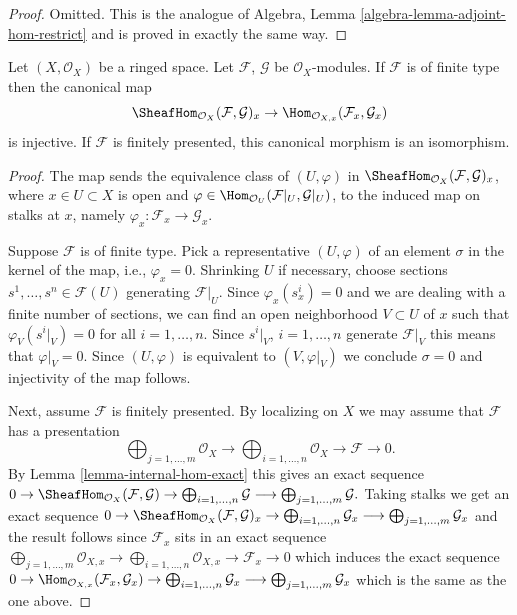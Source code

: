 \begin{proof}
Omitted. This is the analogue of
Algebra, Lemma \ref{algebra-lemma-adjoint-hom-restrict}
and is proved in exactly the same way.
\end{proof}

\begin{lemma}
\label{lemma-stalk-internal-hom}
Let $(X, \mathcal{O}_X)$ be a ringed space.
Let $\mathcal{F}$, $\mathcal{G}$ be $\mathcal{O}_X$-modules.
If $\mathcal{F}$ is of finite type then the canonical map
$$
\SheafHom_{\mathcal{O}_X}(\mathcal{F}, \mathcal{G})_x
\to
\Hom_{\mathcal{O}_{X, x}}(\mathcal{F}_x, \mathcal{G}_x)
$$
is injective.
If $\mathcal{F}$ is finitely presented,
this canonical morphism is an isomorphism.
\end{lemma}

\begin{proof}
The map sends the equivalence class of
$(U, \varphi)$ in $\SheafHom_{\mathcal{O}_X}(\mathcal{F}, \mathcal{G})_x$,
where $x \in U \subset X$ is open and
$\varphi \in \Hom_{\mathcal{O}_U}(\mathcal{F}|_U, \mathcal{G}|_U)$,
to the induced map on stalks at $x$, namely
$\varphi_x : \mathcal{F}_x \to \mathcal{G}_x$.

\medskip\noindent
Suppose $\mathcal{F}$ is of finite type.
Pick a representative $(U, \varphi)$ of an element $\sigma$
in the kernel of the map, i.e., $\varphi_x = 0$.
Shrinking $U$ if necessary, choose sections
$s^1, \ldots, s^n \in \mathcal{F}(U)$ generating $\mathcal{F}|_U$.
Since $\varphi_x(s^i_x) = 0$
and we are dealing with a finite number of sections,
we can find an open neighborhood 
$V \subset U$ of $x$ such that $\varphi_V(s^i|_V)=0$
for all $i = 1, \ldots, n$. Since $s^i|_V$, $i = 1, \ldots, n$ generate
$\mathcal{F}|_V$ this means that $\varphi|_V = 0$.
Since $(U, \varphi)$ is equivalent to $(V, \varphi|_V)$
we conclude $\sigma = 0$ and injectivity of the map follows.

\medskip\noindent
Next, assume $\mathcal{F}$ is finitely presented.
By localizing on $X$ we may assume that $\mathcal{F}$ has a presentation
$$
\bigoplus\nolimits_{j = 1, \ldots, m}
\mathcal{O}_X
\longrightarrow
\bigoplus\nolimits_{i = 1, \ldots, n}
\mathcal{O}_X
\to
\mathcal{F}
\to
0.
$$
By Lemma \ref{lemma-internal-hom-exact} this gives an exact sequence
$
0 \to
\SheafHom_{\mathcal{O}_X}(\mathcal{F}, \mathcal{G}) \to
\bigoplus\nolimits_{i = 1, \ldots, n} \mathcal{G}
\longrightarrow
\bigoplus\nolimits_{j = 1, \ldots, m} \mathcal{G}.
$
Taking stalks we get an exact sequence
$
0 \to
\SheafHom_{\mathcal{O}_X}(\mathcal{F}, \mathcal{G})_x \to
\bigoplus\nolimits_{i = 1, \ldots, n} \mathcal{G}_x
\longrightarrow
\bigoplus\nolimits_{j = 1, \ldots, m} \mathcal{G}_x
$
and the result follows since $\mathcal{F}_x$ sits in
an exact sequence
$
\bigoplus\nolimits_{j = 1, \ldots, m}
\mathcal{O}_{X, x}
\longrightarrow
\bigoplus\nolimits_{i = 1, \ldots, n}
\mathcal{O}_{X, x}
\to
\mathcal{F}_x
\to
0
$
which induces the exact sequence
$
0 \to
\Hom_{\mathcal{O}_{X, x}}(\mathcal{F}_x, \mathcal{G}_x) \to
\bigoplus\nolimits_{i = 1, \ldots, n} \mathcal{G}_x
\longrightarrow
\bigoplus\nolimits_{j = 1, \ldots, m} \mathcal{G}_x
$
which is the same as the one above.
\end{proof}

